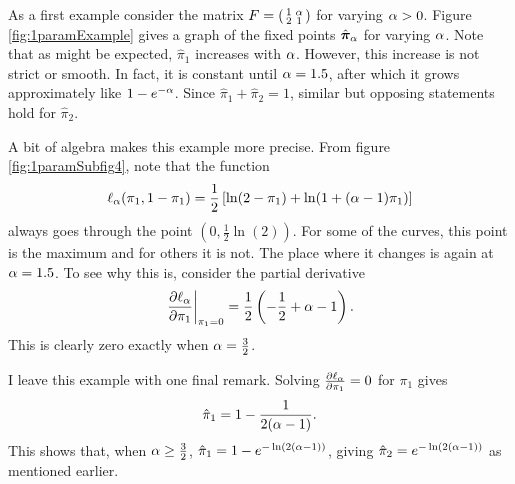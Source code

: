 \begin{eg}\label{example:1paramK2N2}
	As a first example consider the matrix \( F = \begin{psmallmatrix}
	1 & \alpha\\ 2 & 1
	\end{psmallmatrix} \) for varying \( \alpha>0 \).
	 Figure \ref{fig:1paramExample} gives a graph of the fixed points \( \hat{\bm \pi}_\alpha \) for varying \( \alpha \). Note that as might be expected, \( \hat{\pi}_1 \) increases with \( \alpha \). However, this increase is not strict or smooth.  In fact, it is constant until \( \alpha =1.5 \), after which it grows approximately like \( 1-e^{-\alpha} \). Since \( \hat{\pi}_1+\hat{\pi}_2 = 1 \), similar but opposing statements hold for \( \hat{\pi}_2 \).

	 A bit of algebra makes this example more precise.  From figure \ref{fig:1paramSubfig4}, note that the function 
	 \begin{equation}
	  \ell_\alpha (\pi_1,1-\pi_1) = \frac{1}{2}\left[\ln(2-\pi_1)+\ln(1+(\alpha-1)\pi_1)\right]
	 \end{equation} 
	  always goes through the point \( \left(0,\frac{1}{2}\ln(2)\right) \). For some of the curves, this point is the maximum and for others it is not. The place where it changes is again at \( \alpha = 1.5 \). To see why this is, consider the partial derivative
	 \[ \eval{\pdv{\ell_\ga}{\pi_1}}_{\pi_1=0} = \dfrac{1}{2}\left(-\dfrac 12 +\ga-1\right). \] 
	 This is clearly zero exactly when \( \alpha = \frac 32 \).
	 
	 I leave this example with one final remark.  Solving \( \pdv{\ell_\alpha}{\pi_1} = 0\) for \( \pi_1 \) gives 
	 \[ \hat{\pi}_1 = 1-\dfrac{1}{2(\alpha-1)}. \]
	 This shows that, when \( \alpha\geq\frac 32 \), \( \hat{\pi}_1 = 1-e^{-\ln(2(\alpha-1))} \), giving \( \hat{\pi}_2 = e^{-\ln(2(\alpha-1))} \) as mentioned earlier.
	 
\end{eg}



